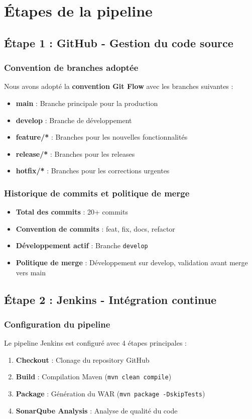 \documentclass[12pt,a4paper]{article}
\begin{document}
\section{Étapes de la pipeline}

\subsection{Étape 1 : GitHub - Gestion du code source}

\subsubsection{Convention de branches adoptée}
Nous avons adopté la \textbf{convention Git Flow} avec les branches suivantes :
\begin{itemize}
    \item \textbf{main} : Branche principale pour la production
    \item \textbf{develop} : Branche de développement
    \item \textbf{feature/*} : Branches pour les nouvelles fonctionnalités
    \item \textbf{release/*} : Branches pour les releases
    \item \textbf{hotfix/*} : Branches pour les corrections urgentes
\end{itemize}

\subsubsection{Historique de commits et politique de merge}
\begin{itemize}
    \item \textbf{Total des commits} : 20+ commits
    \item \textbf{Convention de commits} : feat, fix, docs, refactor
    \item \textbf{Développement actif} : Branche \texttt{develop}
    \item \textbf{Politique de merge} : Développement sur develop, validation avant merge vers main
\end{itemize}

\subsection{Étape 2 : Jenkins - Intégration continue}

\subsubsection{Configuration du pipeline}
Le pipeline Jenkins est configuré avec 4 étapes principales :
\begin{enumerate}
    \item \textbf{Checkout} : Clonage du repository GitHub
    \item \textbf{Build} : Compilation Maven (\texttt{mvn clean compile})
    \item \textbf{Package} : Génération du WAR (\texttt{mvn package -DskipTests})
    \item \textbf{SonarQube Analysis} : Analyse de qualité du code
\end{enumerate}
\end{document}
